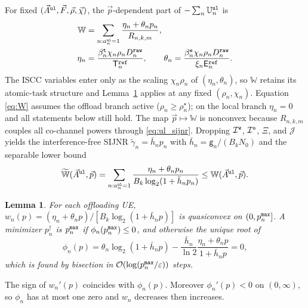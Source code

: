 \documentclass[journal]{IEEEtran}
\newtheorem{lemma}{Lemma}
\begin{document}
For fixed $(\vec{A}^{\tt ul},\vec{F},\vec{\rho},\vec{\chi})$, the $\vec{p}$-dependent part of $-\sum_n\mathbb{U}_n^{\tt ul}$ is
\begin{align}
\mathbb{W}
&=\sum_{n:a_n^{\tt ul}=1}
\frac{\eta_n+\theta_n p_n}{R_{n,k,m}},
\label{eq:W}\\
\eta_n&=\frac{\beta_n^{\tt t}\chi_n\rho_n D_n^{\tt raw}}{\mathsf{T}_n^{\tt ref}},
\qquad
\theta_n=\frac{\beta_n^{\tt e}\chi_n\rho_n D_n^{\tt raw}}{\xi_n\mathsf{E}_n^{\tt ref}}.
\nonumber
\end{align}
The ISCC variables enter only as the scaling $\chi_n\rho_n$ of $(\eta_n,\theta_n)$, so $\mathbb{W}$ retains its atomic-task structure and Lemma~\ref{lem:quasi} applies at any fixed $(\rho_n,\chi_n)$. Equation \eqref{eq:W} assumes the offload branch active ($\rho_n\ge\rho_n^\star$); on the local branch $\eta_n=0$ and all statements below still hold.
The map $\vec{p}\mapsto\mathbb{W}$ is nonconvex because $R_{n,k,m}$ couples all co-channel powers through \eqref{eq:ul_sijnr}. Dropping $\mathcal{I}^{\tt w}$, $\mathcal{I}^{\tt o}$, $\Xi$, and $\mathcal{J}$ yields the interference-free SIJNR $\tilde\gamma_{n}= \bar h_n p_n$ with $\bar h_n=\mathsf{g}_n/(B_k N_0)$ and the separable lower bound
\begin{equation}
\widetilde{\mathbb{W}}(\vec{A}^{\tt ul},\vec{p})
=\sum_{n:a_n^{\tt ul}=1}
\frac{\eta_n+\theta_n p_n}{B_k\log_2(1+\bar h_n p_n)}
\le \mathbb{W}(\vec{A}^{\tt ul},\vec{p}).
\label{eq:Wtil}
\end{equation}

\begin{lemma}\label{lem:quasi}
For each offloading UE, $w_n(p)=(\eta_n+\theta_n p)/[B_k\log_2(1+\bar h_n p)]$ is quasiconvex on $(0,p_n^{\tt max}]$. A minimizer $p_n^\dagger$ is $p_n^{\tt max}$ if $\phi_n(p_n^{\tt max})\le 0$, and otherwise the unique root of
\begin{equation}
\phi_n(p)
=\theta_n\log_2(1+\bar h_n p)
-\frac{\bar h_n}{\ln 2}\frac{\eta_n+\theta_n p}{1+\bar h_n p}=0,
\label{eq:phi}
\end{equation}
which is found by bisection in $\mathcal{O}(\log(p_n^{\tt max}/\varepsilon))$ steps.
\end{lemma}
\begin{IEEEproof}
The sign of $w_n'(p)$ coincides with $\phi_n(p)$. Moreover $\phi_n'(p)<0$ on $(0,\infty)$, so $\phi_n$ has at most one zero and $w_n$ decreases then increases.
\end{IEEEproof}
\end{document}
